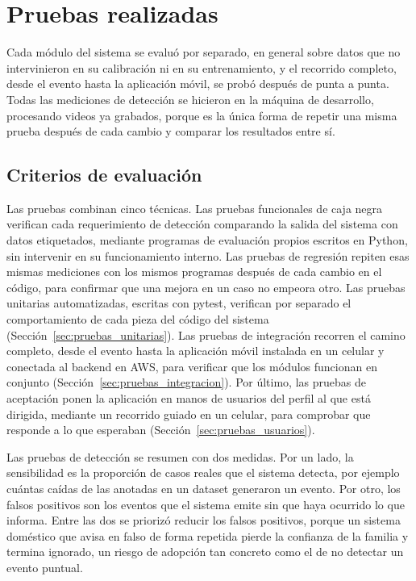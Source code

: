 \chapter{Pruebas realizadas}\label{chapter05}

Cada módulo del sistema se evaluó por separado, en general sobre datos que no intervinieron en su calibración ni en su entrenamiento, y el recorrido completo, desde el evento hasta la aplicación móvil, se probó después de punta a punta.
Todas las mediciones de detección se hicieron en la máquina de desarrollo, procesando videos ya grabados, porque es la única forma de repetir una misma prueba después de cada cambio y comparar los resultados entre sí.

\section{Criterios de evaluación}
\label{sec:criterios_evaluacion}

Las pruebas combinan cinco técnicas.
Las pruebas funcionales de caja negra verifican cada requerimiento de detección comparando la salida del sistema con datos etiquetados, mediante programas de evaluación propios escritos en Python, sin intervenir en su funcionamiento interno.
Las pruebas de regresión repiten esas mismas mediciones con los mismos programas después de cada cambio en el código, para confirmar que una mejora en un caso no empeora otro.
Las pruebas unitarias automatizadas, escritas con pytest, verifican por separado el comportamiento de cada pieza del código del sistema (Sección~\ref{sec:pruebas_unitarias}).
Las pruebas de integración recorren el camino completo, desde el evento hasta la aplicación móvil instalada en un celular y conectada al backend en AWS, para verificar que los módulos funcionan en conjunto (Sección~\ref{sec:pruebas_integracion}).
Por último, las pruebas de aceptación ponen la aplicación en manos de usuarios del perfil al que está dirigida, mediante un recorrido guiado en un celular, para comprobar que responde a lo que esperaban (Sección~\ref{sec:pruebas_usuarios}).

Las pruebas de detección se resumen con dos medidas.
Por un lado, la sensibilidad es la proporción de casos reales que el sistema detecta, por ejemplo cuántas caídas de las anotadas en un dataset generaron un evento.
Por otro, los falsos positivos son los eventos que el sistema emite sin que haya ocurrido lo que informa.
Entre las dos se priorizó reducir los falsos positivos, porque un sistema doméstico que avisa en falso de forma repetida pierde la confianza de la familia y termina ignorado, un riesgo de adopción tan concreto como el de no detectar un evento puntual.


